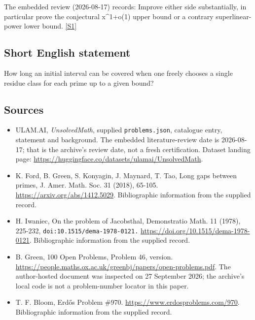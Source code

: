 \documentclass[11pt,a4paper]{article}
\newcommand{\sref}[2]{\hyperlink{source:#1:#2}{[S#2]}}
\begin{document}
The embedded review (2026-08-17) records: Improve either side substantially, in particular prove the conjectural x\textasciicircum{}{1+o(1)} upper bound or a contrary superlinear-power lower bound. \sref{statement}{1}

\subsection{Short English statement}

How long an initial interval can be covered when one freely chooses a single residue class for each prime up to a given bound?

\subsection{Sources}

{\small

\begin{itemize}

\item[\hypertarget{source:statement:1}{S1}] ULAM.AI, \emph{UnsolvedMath}, supplied \texttt{problems.json}, catalogue entry, statement and background. The embedded literature-review date is 2026-08-17; that is the archive’s review date, not a fresh certification. Dataset landing page: \url{https://huggingface.co/datasets/ulamai/UnsolvedMath}.

\item[\hypertarget{source:statement:2}{S2}] K. Ford, B. Green, S. Konyagin, J. Maynard, T. Tao, Long gaps between primes, J. Amer. Math. Soc. 31 (2018), 65-105. \url{https://arxiv.org/abs/1412.5029}. Bibliographic information from the supplied record.

\item[\hypertarget{source:statement:3}{S3}] H. Iwaniec, On the problem of Jacobsthal, Demonstratio Math. 11 (1978), 225-232, \nolinkurl{doi:10.1515/dema-1978-0121.} \url{https://doi.org/10.1515/dema-1978-0121}. Bibliographic information from the supplied record.

\item[\hypertarget{source:statement:4}{S4}] B. Green, 100 Open Problems, Problem 46, version. \url{https://people.maths.ox.ac.uk/greenbj/papers/open-problems.pdf}. The author-hosted document was inspected on 27 September 2026; the archive’s local code is not a problem-number locator in this paper.

\item[\hypertarget{source:statement:5}{S5}] T. F. Bloom, Erdős Problem \#970. \url{https://www.erdosproblems.com/970}. Bibliographic information from the supplied record.

\end{itemize}

}

\label{end:statement}
\end{document}
